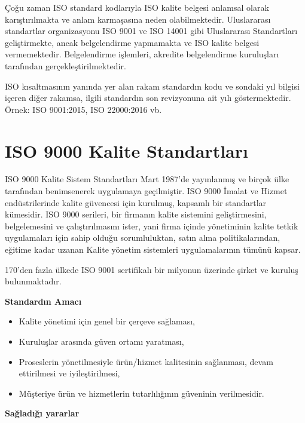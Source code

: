 \documentclass[
]{book}
\providecommand{\tightlist}{%
  \setlength{\itemsep}{0pt}\setlength{\parskip}{0pt}}
\begin{document}
Çoğu zaman ISO standard kodlarıyla ISO kalite belgesi anlamsal olarak karıştırılmakta ve anlam karmaşasına neden olabilmektedir. Uluslararası standartlar organizasyonu ISO 9001 ve ISO 14001 gibi Uluslararası Standartları geliştirmekte, ancak belgelendirme yapmamakta ve ISO kalite belgesi vermemektedir. Belgelendirme işlemleri, akredite belgelendirme kuruluşları tarafından gerçekleştirilmektedir.

ISO kısaltmasının yanında yer alan rakam standardın kodu ve sondaki yıl bilgisi içeren diğer rakamsa, ilgili standardın son revizyonuna ait yılı göstermektedir. Örnek: ISO 9001:2015, ISO 22000:2016 vb.

\hypertarget{iso-9000-kalite-standartlarux131}{%
\section{ISO 9000 Kalite Standartları}\label{iso-9000-kalite-standartlarux131}}

ISO 9000 Kalite Sistem Standartları Mart 1987'de yayınlanmış ve birçok ülke tarafından benimsenerek uygulamaya geçilmiştir. ISO 9000 İmalat ve Hizmet endüstrilerinde kalite güvencesi için kurulmuş, kapsamlı bir standartlar kümesidir. ISO 9000 serileri, bir firmanın kalite sistemini geliştirmesini, belgelemesini ve çalıştırılmasını ister, yani firma içinde yönetiminin kalite tetkik uygulamaları için sahip olduğu sorumluluktan, satın alma politikalarından, eğitime kadar uzanan Kalite yönetim sistemleri uygulamalarının tümünü kapsar.

170'den fazla ülkede ISO 9001 sertifikalı bir milyonun üzerinde şirket ve kuruluş bulunmaktadır.

\textbf{Standardın Amacı}

\begin{itemize}
\tightlist
\item
  Kalite yönetimi için genel bir çerçeve sağlaması,
\item
  Kuruluşlar arasında güven ortamı yaratması,
\item
  Proseslerin yönetilmesiyle ürün/hizmet kalitesinin sağlanması, devam ettirilmesi ve iyileştirilmesi,
\item
  Müşteriye ürün ve hizmetlerin tutarlılığının güveninin verilmesidir.
\end{itemize}

\textbf{Sağladığı yararlar}
\end{document}
